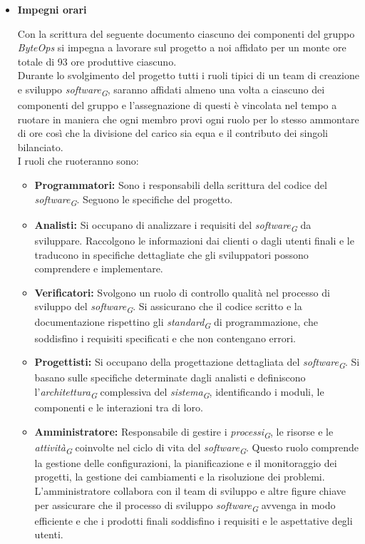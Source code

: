 \documentclass{article}
\begin{document}
\begin{itemize}
    \item[] \textbf{\fontsize{12}{6}\selectfont Impegni orari}
    
    Con la scrittura del seguente documento ciascuno dei componenti del gruppo \textit{ByteOps} si impegna a lavorare sul progetto a noi affidato per un monte ore totale di 93 ore produttive ciascuno. \\
    Durante lo svolgimento del progetto tutti i ruoli tipici di un team di creazione e sviluppo \textit{software}\textsubscript{\textit{G}}, saranno affidati almeno una volta a ciascuno dei componenti del gruppo e  l’assegnazione di questi è vincolata nel tempo a ruotare in maniera che ogni membro provi ogni ruolo per lo stesso ammontare di ore così che la divisione del carico sia equa e il contributo dei singoli bilanciato. \\
    I ruoli che ruoteranno sono: 
    \begin{itemize}
        \item \textbf{Programmatori:} Sono i responsabili della scrittura del codice del \textit{software}\textsubscript{\textit{G}}. Seguono le specifiche del progetto. 
        
        \item \textbf{Analisti:} Si occupano di analizzare i requisiti del \textit{software}\textsubscript{\textit{G}} da sviluppare. Raccolgono le informazioni dai clienti o dagli utenti finali e le traducono in specifiche dettagliate che gli sviluppatori possono comprendere e implementare. 
        
        \item \textbf{Verificatori:} Svolgono un ruolo di controllo qualità nel processo di sviluppo del \textit{software}\textsubscript{\textit{G}}. Si assicurano che il codice scritto e la documentazione rispettino gli \textit{standard}\textsubscript{\textit{G}} di programmazione, che soddisfino i requisiti specificati e che non contengano errori. 
        
        \item \textbf{Progettisti:} Si occupano della progettazione dettagliata del \textit{software}\textsubscript{\textit{G}}. Si basano sulle specifiche determinate dagli analisti e definiscono l'\textit{architettura}\textsubscript{\textit{G}} complessiva del \textit{sistema}\textsubscript{\textit{G}}, identificando i moduli, le componenti e le interazioni tra di loro.  

        \item \textbf{Amministratore:} Responsabile di gestire i \textit{processi}\textsubscript{\textit{G}}, le risorse e le \textit{attività}\textsubscript{\textit{G}} coinvolte nel ciclo di vita del \textit{software}\textsubscript{\textit{G}}. Questo ruolo comprende la gestione delle configurazioni, la pianificazione e il monitoraggio dei progetti, la gestione dei cambiamenti e la risoluzione dei problemi. L'amministratore collabora con il team di sviluppo e altre figure chiave per assicurare che il processo di sviluppo \textit{software}\textsubscript{\textit{G}} avvenga in modo efficiente e che i prodotti finali soddisfino i requisiti e le aspettative degli utenti.
        

\end{itemize}
\end{itemize}
\end{document}
